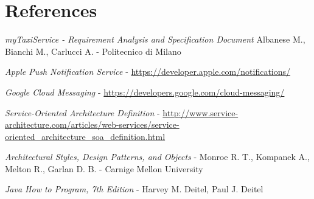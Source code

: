 \pagebreak
\section{References}
\begin{thebibliography}{9}

    \emph{myTaxiService - Requirement Analysis and Specification Document}
    Albanese M., Bianchi M., Carlucci A. - Politecnico di Milano

    \emph{Apple Push Notification Service} -
    \url{https://developer.apple.com/notifications/}

    \emph{Google Cloud Messaging} - 
    \url{https://developers.google.com/cloud-messaging/}

    \emph{Service-Oriented Architecture Definition} - 
    \url{http://www.service-architecture.com/articles/web-services/service-oriented_architecture_soa_definition.html}

    \emph{Architectural Styles, Design Patterns, and Objects} - 
    Monroe R. T., Kompanek A., Melton R., Garlan D. B. - 
    Carnige Mellon University
    
	\emph{Java How to Program, 7th Edition} - 
	Harvey M. Deitel, Paul J. Deitel

\end{thebibliography}
